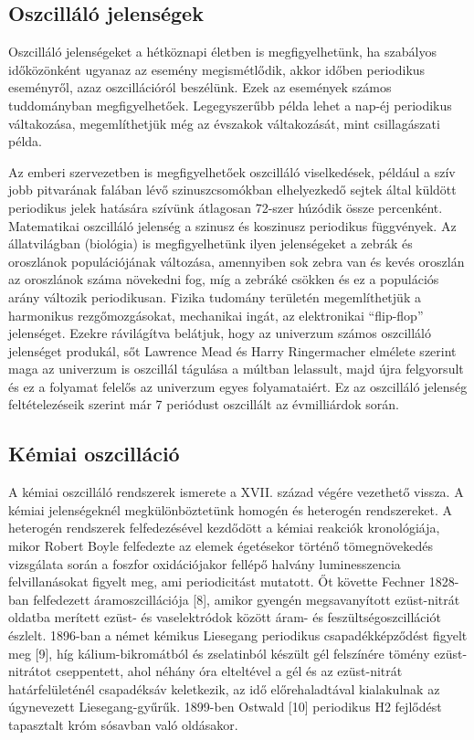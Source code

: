 \subsection{Oszcilláló jelenségek}
Oszcilláló jelenségeket a hétköznapi életben is megfigyelhetünk, ha szabályos időközönként ugyanaz az esemény megismétlődik, akkor időben periodikus eseményről, azaz oszcillációról beszélünk. Ezek az események számos tuddományban megfigyelhetőek. Legegyszerűbb példa lehet a nap-éj periodikus váltakozása, megemlíthetjük még az évszakok váltakozását, mint csillagászati példa.

Az emberi szervezetben is megfigyelhetőek oszcilláló viselkedések, például a szív jobb pitvarának falában lévő szinuszcsomókban elhelyezkedő sejtek által küldött periodikus jelek hatására  szívünk átlagosan 72-szer húzódik össze percenként. Matematikai oszcilláló jelenség a szinusz és koszinusz periodikus függvények. Az állatvilágban (biológia) is megfigyelhetünk ilyen jelenségeket a zebrák és oroszlánok populációjának változása, amennyiben sok zebra van és kevés oroszlán az oroszlánok száma növekedni fog, míg a zebráké csökken és ez a populációs arány változik periodikusan. Fizika tudomány területén megemlíthetjük a harmonikus rezgőmozgásokat, mechanikai ingát,  az elektronikai “flip-flop” jelenséget. Ezekre rávilágítva belátjuk, hogy az univerzum számos oszcilláló jelenséget produkál, sőt Lawrence Mead és Harry Ringermacher elmélete \cite{ringermacher2017strong}  szerint maga az univerzum is oszcillál tágulása a múltban lelassult, majd újra felgyorsult és ez a folyamat felelős az univerzum egyes folyamataiért. Ez az oszcilláló jelenség feltételezéseik szerint már 7 periódust oszcillált az évmilliárdok során.

\subsection{Kémiai oszcilláció}
A kémiai oszcilláló rendszerek ismerete a XVII. század végére vezethető vissza. A kémiai jelenségeknél megkülönböztetünk homogén és heterogén rendszereket. A heterogén rendszerek felfedezésével kezdődött a kémiai reakciók kronológiája, mikor Robert Boyle \cite{harvey1957history} felfedezte az elemek égetésekor történő tömegnövekedés vizsgálata során a foszfor oxidációjakor fellépő halvány luminesszencia felvillanásokat figyelt meg, ami periodicitást mutatott. Őt követte  Fechner 1828-ban felfedezett áramoszcillációja [8], amikor gyengén megsavanyított ezüst-nitrát oldatba merített ezüst- és vaselektródok között áram- és feszültségoszcillációt észlelt. 1896-ban a német kémikus Liesegang periodikus csapadékképződést figyelt meg [9], híg kálium-bikromátból és zselatinból készült gél felszínére tömény ezüst-nitrátot cseppentett, ahol néhány óra elteltével a gél és az ezüst-nitrát határfelületénél csapadéksáv keletkezik, az idő előrehaladtával kialakulnak az úgynevezett Liesegang-gyűrűk. 1899-ben Ostwald [10] periodikus H2 fejlődést tapasztalt króm sósavban való oldásakor.

